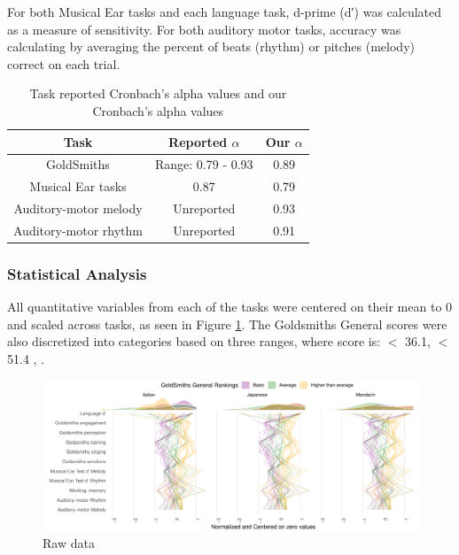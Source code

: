 \documentclass[a4paper]{article}
\begin{document}
For both Musical Ear tasks and each language task,  d-prime (d′) was calculated as a measure of sensitivity\cite{Macmillan_Creelman_2004}. For both auditory motor tasks, accuracy was calculating by averaging the percent of beats (rhythm) or pitches (melody) correct on each trial.


\setlength{\abovedisplayskip}{-10pt}
\setlength{\belowdisplayskip}{-10pt}
\setlength{\abovetopsep}{-10pt}
\setlength{\belowbottomsep}{-10pt}
\begin{table}[h]
\centering
\begin{tabular}{|c|c|c|}
\hline
\textbf{Task} & \textbf{Reported $\alpha$}& \textbf{Our $\alpha$} \\
\hline
GoldSmiths \cite{Müllensiefen_Gingras_Musil_Stewart_2014} & Range: 0.79 - 0.93 & 0.89 \\
Musical Ear tasks \cite{Wallentin_Nielsen_Friis-Olivarius_Vuust_Vuust_2010}& 0.87 & 0.79 \\
Auditory-motor melody \cite{Kachlicka_Saito_Tierney_2019}& Unreported & 0.93 \\
Auditory-motor rhythm\cite{Kachlicka_Saito_Tierney_2019}& Unreported & 0.91 \\
\hline
\end{tabular}
\caption{Task reported Cronbach's alpha values and our Cronbach's alpha values}
\label{tab:comparison}
\end{table}

\vspace{-\baselineskip}

\subsubsection{Statistical Analysis}

All quantitative variables from each of the tasks were centered on their mean to 0 and scaled across tasks, as seen in Figure \ref{fig:centered_data}. The Goldsmiths General scores were also discretized into categories based on three ranges, where score is:  $<$ 36.1, \quad {} $<$ 51.4  , \quad {}  \cite{Müllensiefen_Gingras_Musil_Stewart_2014}. 

\begin{figure}[t]
  \centering
  \includegraphics[width=.9\textwidth]{SP_24_visuals/by_gs.pdf}
  \caption{Raw data}
  \label{fig:centered_data}
\end{figure}
\end{document}
